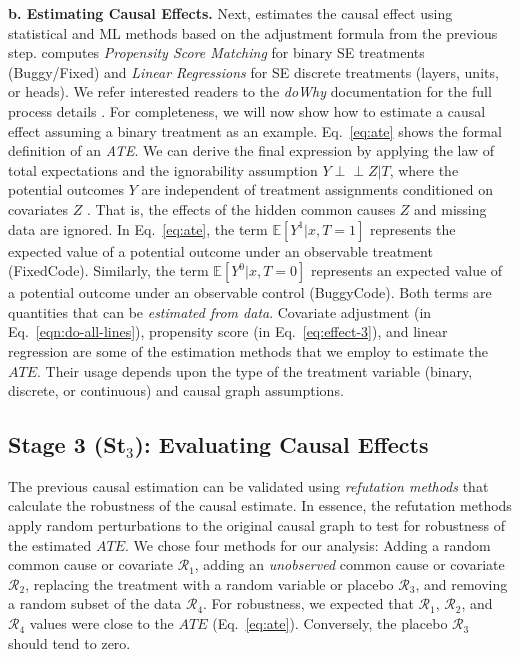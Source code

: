 \textbf{b. Estimating Causal Effects.} Next, \codegen estimates the causal effect using statistical and ML methods based on the adjustment formula from the previous step. \codegen computes \textit{Propensity Score Matching} for binary SE treatments (\ie Buggy/Fixed) and \textit{Linear Regressions} for SE discrete treatments (\eg layers, units, or heads). We refer interested readers to the \textit{doWhy} documentation for the full process details \citep{dowhy}. For completeness, we will now show how to estimate a causal effect assuming a binary treatment as an example. Eq.~\ref{eq:ate} shows the formal definition of an \textit{ATE}. We can derive the final expression by applying the law of total expectations and the ignorability assumption  $Y \perp\!\!\!\perp  Z|T$, where the potential outcomes $Y$ are independent of treatment assignments conditioned on covariates $Z$ \citep{Pearl2009Causality}. That is, the effects of the hidden common causes $Z$ and missing data are ignored. In Eq.~\ref{eq:ate}, the term $\mathbb{E}[Y^1|x,T=1]$ represents the expected value of a potential outcome under an observable treatment (\ie FixedCode). Similarly, the term $\mathbb{E}[Y^0|x,T=0]$ represents an expected value of a potential outcome under an observable control (\ie BuggyCode). Both terms are quantities that can be \textit{estimated from data}. Covariate adjustment (in Eq.~\ref{eqn:do-all-lines}), propensity score (in Eq.~\ref{eq:effect-3}), and linear regression are some of the estimation methods that we employ to estimate the $ATE$. Their usage depends upon the type of the treatment variable (\ie binary, discrete, or continuous) and causal graph assumptions.

\subsection{Stage 3 (St$_3$): Evaluating Causal Effects}
The previous causal estimation can be validated using \textit{refutation methods} that calculate the robustness of the causal estimate. In essence, the refutation methods apply random perturbations to the original causal graph to test for robustness of the estimated $ATE$. We chose four methods for our analysis: Adding a random common cause or covariate $\mathcal{R}_1$, adding an \textit{unobserved} common cause or covariate $\mathcal{R}_2$, replacing the treatment with a random variable or placebo $\mathcal{R}_3$, and removing a random subset of the data $\mathcal{R}_4$. For robustness, we expected that $\mathcal{R}_1$, $\mathcal{R}_2$, and $\mathcal{R}_4$ values were close to the $ATE$ (Eq.~\ref{eq:ate}). Conversely, the placebo $\mathcal{R}_3$ should tend to zero.

